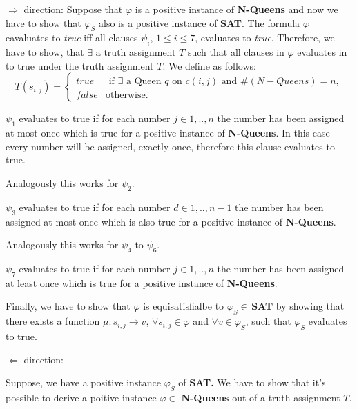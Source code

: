 $\Rightarrow $ direction:\newline
Suppose that $\varphi $ is a positive instance of \textbf{N-Queens} and now
we have to show that $\varphi _{S}$ also is a positive instance of \textbf{%
SAT}.\newline
The formula $\varphi $ eavaluates to \textit{true} iff all clauses $\psi _{i}
$, $1\leq i\leq 7$, evaluates to \textit{true}. Therefore, we have to show,
that $\exists $ a truth assignment $T$ such that all clauses in $\varphi $
evaluates in  to true under the truth assignment $T$. We define as follows:%
\newline
\begin{equation*}
T(s_{i,j})=\left\{ 
\begin{array}{cl}
true & \text{ if }\exists \text{ a Queen }q\text{ on }c(i,j)\text{ and }%
\#(N-Queens)=n, \\ 
false & \text{otherwise.}%
\end{array}%
\right. 
\end{equation*}

$\psi _{1}$ evaluates to true if for each number $j\in {1,..,n}$ the number
has been assigned at most once which is true for a positive instance of 
\textbf{N-Queens}. In this case every number will be assigned, exactly once,
therefore this clause evaluates to true.

Analogously this works for $\psi _{2}$.

$\psi _{3}$ evaluates to true if for each number $d\in {1,..,n-1}$ the
number has been assigned at most once which is also true for a positive
instance of \textbf{N-Queens}.

Analogously this works for $\psi _{4}$ to $\psi _{6}$.

$\psi _{7}$ evaluates to true if for each number $j\in {1,..,n}$ the number
has been assigned at least once which is true for a positive instance of 
\textbf{N-Queens}.

Finally, we have to show that $\varphi $ is equisatisfialbe to \bigskip $%
\varphi _{S}\in \,$\textbf{SAT} by showing that there exists a function $\mu
:s_{i,j}\rightarrow v$, $\forall s_{i,j}\in \varphi $ and $\forall v\in
\varphi _{S}$, such that $\varphi _{S}$ evaluates to true.

$\Leftarrow $ direction:

Suppose, we have a positive instance $\varphi _{S}$ of \textbf{SAT.} We have
to show that it's possible to derive a poitive instance $\varphi \in $ 
\textbf{N-Queens} out of a truth-assignment $T$.

